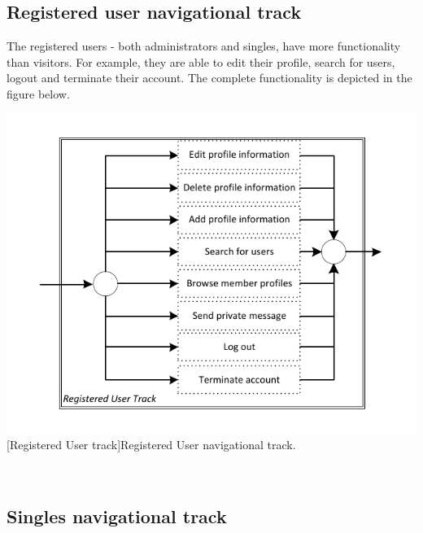 \documentclass[11pt, a4paper,svglistings,oneside]{book}
\begin{document}
\subsection{Registered user navigational track}

The registered users - both administrators and singles, have more functionality than visitors. For example, they are able to edit their profile, search for users, logout and terminate their account. The complete functionality is depicted in the figure below.
$\;$ \\
\noindent\begin{minipage}{\textwidth}
    \centering
   \includegraphics[scale=1]{Nav_RegisteredUser_Track.pdf}
 [Registered User track]{Registered User navigational track.}
\end{minipage}
$\;$ \\ 

\subsection{Singles navigational track}
\end{document}

